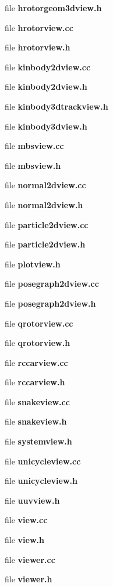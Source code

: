 \begin{DoxyCompactItemize}
\item 
file {\bf hrotorgeom3dview.\-h}
\item 
file {\bf hrotorview.\-cc}
\item 
file {\bf hrotorview.\-h}
\item 
file {\bf kinbody2dview.\-cc}
\item 
file {\bf kinbody2dview.\-h}
\item 
file {\bf kinbody3dtrackview.\-h}
\item 
file {\bf kinbody3dview.\-h}
\item 
file {\bf mbsview.\-cc}
\item 
file {\bf mbsview.\-h}
\item 
file {\bf normal2dview.\-cc}
\item 
file {\bf normal2dview.\-h}
\item 
file {\bf particle2dview.\-cc}
\item 
file {\bf particle2dview.\-h}
\item 
file {\bf plotview.\-h}
\item 
file {\bf posegraph2dview.\-cc}
\item 
file {\bf posegraph2dview.\-h}
\item 
file {\bf qrotorview.\-cc}
\item 
file {\bf qrotorview.\-h}
\item 
file {\bf rccarview.\-cc}
\item 
file {\bf rccarview.\-h}
\item 
file {\bf snakeview.\-cc}
\item 
file {\bf snakeview.\-h}
\item 
file {\bf systemview.\-h}
\item 
file {\bf unicycleview.\-cc}
\item 
file {\bf unicycleview.\-h}
\item 
file {\bf uuvview.\-h}
\item 
file {\bf view.\-cc}
\item 
file {\bf view.\-h}
\item 
file {\bf viewer.\-cc}
\item 
file {\bf viewer.\-h}
\end{DoxyCompactItemize}
